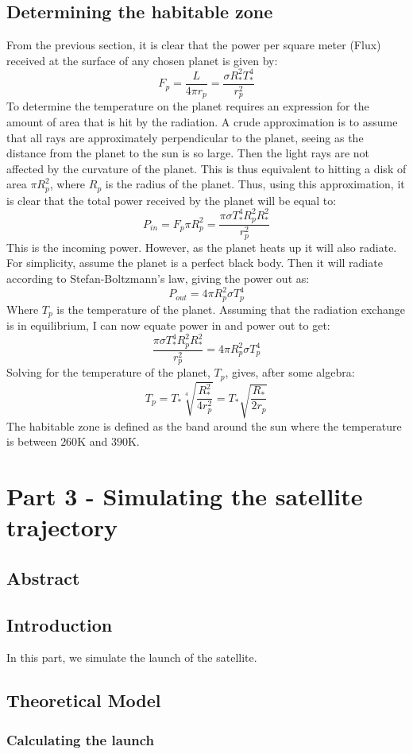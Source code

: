 \documentclass[a4paper,10pt,english]{article}
\begin{document}
\subsection*{Determining the habitable zone}
From the previous section, it is clear that the power per square meter (Flux) received at the surface of any chosen planet is given by:
$$F_p=\frac{L}{4\pi r_p}=\frac{\sigma R_*^2 T_*^4}{r_p^2}$$
To determine the temperature on the planet requires an expression for the amount of area that is hit by the radiation. A crude approximation is to assume that all rays are approximately perpendicular to the planet, seeing as the distance from the planet to the sun is so large. Then the light rays are not affected by the curvature of the planet. This is thus equivalent to hitting a disk of area $\pi R_p^2$, where $R_p$ is the radius of the planet. Thus, using this approximation, it is clear that the total power received by the planet will be equal to:
$$P_{in}=F_p\pi R_p^2 = \frac{\pi \sigma  T_*^4 R_p^2R_*^2}{r_p^2}$$
This is the incoming power. However, as the planet heats up it will also radiate. For simplicity, assume the planet is a perfect black body. Then it will radiate according to Stefan-Boltzmann's law, giving the power out as:
$$P_{out}=4\pi R_p^2 \sigma T_p^4$$
Where $T_p$ is the temperature of the planet. Assuming that the radiation exchange is in equilibrium, I can now equate power in and power out to get:
$$\frac{\pi \sigma  T_*^4 R_p^2R_*^2}{r_p^2}=4\pi R_p^2 \sigma T_p^4$$
Solving for the temperature of the planet, $T_p$, gives, after some algebra:
$$T_p=T_*\sqrt[4]{\frac{R_*^2}{4r_p^2}}=T_*\sqrt{\frac{R_*}{2r_p}}$$
The habitable zone is defined as the band around the sun where the temperature is between $260$K and  $390$K.
\section{Part 3 - Simulating the satellite trajectory}
\subsection{Abstract}
\subsection{Introduction}
In this part, we simulate the launch of the satellite. 
\subsection{Theoretical Model}
\subsubsection{Calculating the launch}
\end{document}
